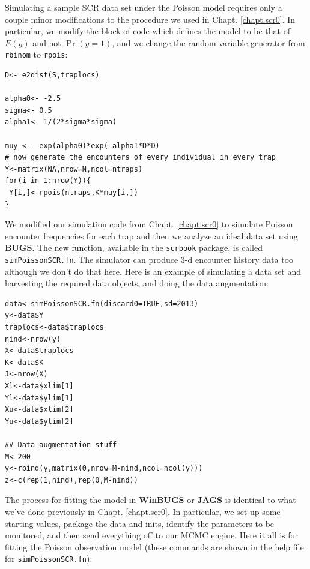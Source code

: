 Simulating a sample SCR data set under the Poisson model requires only
a couple minor modifications to the procedure we used in
Chapt. \ref{chapt.scr0}. In
particular, we modify the block of code which defines the model to be
that of $E(y)$ and not $\Pr(y=1)$, and we change the random variable
generator from \mbox{\tt rbinom} to \mbox{\tt rpois}:
{\small
\begin{verbatim}
D<- e2dist(S,traplocs)

alpha0<- -2.5
sigma<- 0.5
alpha1<- 1/(2*sigma*sigma)

muy <-  exp(alpha0)*exp(-alpha1*D*D)
# now generate the encounters of every individual in every trap
Y<-matrix(NA,nrow=N,ncol=ntraps)
for(i in 1:nrow(Y)){
 Y[i,]<-rpois(ntraps,K*muy[i,])
}
\end{verbatim}
}

We modified our simulation code from Chapt. \ref{chapt.scr0} to
simulate Poisson encounter frequencies for each trap and then we
analyze an ideal data set using {\bf BUGS}. The new function,
available in the \mbox{\tt scrbook} package, is called {\tt
  simPoissonSCR.fn}.  The simulator can produce 3-d encounter history
data too although we don't do that here.  Here is an example of
simulating a data set and harvesting the required data objects, and
doing the data augmentation:

{\small
\begin{verbatim}
data<-simPoissonSCR.fn(discard0=TRUE,sd=2013)
y<-data$Y
traplocs<-data$traplocs
nind<-nrow(y)
X<-data$traplocs
K<-data$K
J<-nrow(X)
Xl<-data$xlim[1]
Yl<-data$ylim[1]
Xu<-data$xlim[2]
Yu<-data$ylim[2]

## Data augmentation stuff
M<-200
y<-rbind(y,matrix(0,nrow=M-nind,ncol=ncol(y)))
z<-c(rep(1,nind),rep(0,M-nind))
\end{verbatim}
}

The process for fitting
the model in {\bf WinBUGS} or {\bf JAGS} is identical to what we've done
previously in Chapt. \ref{chapt.scr0}. In particular, we set up some
starting values, package the data and inits, identify the parameters
to be monitored, and then send everything off to our MCMC engine. Here
it all is for fitting the Poisson observation model (these commands
are shown in the help file for \mbox{\tt simPoissonSCR.fn}):

